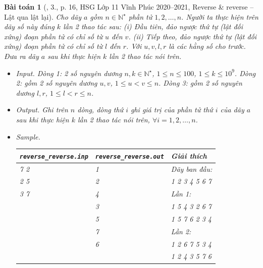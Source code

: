 \documentclass{article}
\newtheorem{baitoan}{Bài toán}
\begin{document}
\begin{baitoan}[\cite{Trung_HSG_THPT_Tin}, 3., p. 16, HSG Lớp 11 Vĩnh Phúc 2020--2021, Reverse \& reverse -- Lật qua lật lại]
	Cho dãy $a$ gồm $n\in\mathbb{N}^\star$ phần tử $1,2,\ldots,n$. Người ta thực hiện trên dãy số này đúng $k$ lần 2 thao tác sau: (i) Đầu tiên, đảo ngược thứ tự (lật đối xứng) đoạn phần tử có chỉ số từ $u$ đến $v$. (ii) Tiếp theo, đảo ngược thứ tự (lật đối xứng) đoạn phần tử có chỉ số từ $l$ đến $r$. Với $u,v,l,r$ là các hằng số cho trước. Đưa ra dãy $a$ sau khi thực hiện $k$ lần 2 thao tác nói trên.
	\begin{itemize}
		\item {\sf Input.} Dòng 1: 2 số nguyên dương $n,k\in\mathbb{N}^\star$, $1\le n\le100$, $1\le k\le10^9$. Dòng 2: gồm 2 số nguyên dương $u,v$, $1\le u < v\le n$. Dòng 3: gồm 2 số nguyên dương $l,r$, $1\le l < r\le n$.
		\item {\sf Output.} Ghi trên $n$ dòng, dòng thứ $i$ ghi giá trị của phần tử thứ $i$ của dãy $a$ sau khi thực hiện $k$ lần 2 thao tác nói trên, $\forall i = 1,2,\ldots,n$.
		\item {\sf Sample.}
		\begin{table}[H]
			\centering
			\begin{tabular}{|l|l|l|}
				\hline
				\verb|reverse_reverse.inp| & \verb|reverse_reverse.out| & Giải thích\\
				\hline
				7 2 & 1 & Dãy ban đầu: \\
				2 5 & 2 & 1 2 3 4 5 6 7 \\
				3 7 & 4 & Lần 1: \\
				& 3 & 1 \textit{5 4 3 2} 6 7 \\
				& 5 & 1 5 \textit{7 6 2 3 4} \\
				& 7 & Lần 2: \\
				& 6 & 1 \textit{2 6 7 5} 3 4 \\
				& & 1 2 4 3 5 7 6 \\
				\hline
			\end{tabular}
		\end{table}
	\end{itemize}
\end{baitoan}
\end{document}
